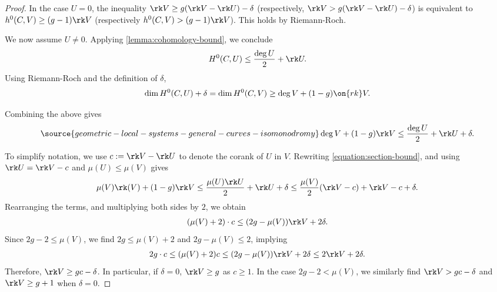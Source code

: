 \begin{proof}
	In the case $U = 0$, the inequality
	$\rk V \geq g (\rk V - \rk U)-\delta$ (respectively, $\rk V> g (\rk V - \rk
	U)-\delta$)
	is equivalent to
	$h^0(C, V) \geq (g-1) \rk V$ (respectively $h^0(C, V) > (g-1) \rk V$).
	This holds by Riemann-Roch.

	We now assume $U \neq 0$.
	Applying \autoref{lemma:cohomology-bound}, we conclude
	\begin{align*}
	H^0(C,U) \leq \frac{\deg
	U}{2} + \rk U.
	\end{align*}
	Using Riemann-Roch and the definition of $\delta$,
	\begin{align*}
	\dim H^0(C,U) + \delta = \dim H^0(C, V) \geq \deg V + (1-g)
	\on{rk}
	V.
	\end{align*}

	Combining the above gives
	\begin{align}
		\label{equation:section-bound}
\source{geometric-local-systems-general-curves-isomonodromy}
		\deg V + (1-g) \rk V \leq \frac{\deg U}{2} + \rk U + \delta.
	\end{align}

	To simplify notation, we use $c := \rk V - \rk U$ to denote the corank
	of $U$ in $V$.
	Rewriting \eqref{equation:section-bound}, and using $\rk U = \rk V - c$ and $\mu(U) \leq
	\mu(V)$ gives
	\begin{align*}
		\mu(V) \rk (V) + (1-g) \rk V \leq \frac{\mu(U) \rk U}{2} + \rk U
		+ \delta
		\leq \frac{\mu(V)}{2} (\rk V - c) + \rk V - c + \delta.
	\end{align*}
	Rearranging the terms,
	and multiplying both sides by $2$, we obtain
	\begin{align*}
		(\mu(V)+2) \cdot c \leq (2g-\mu(V)) \rk V + 2 \delta.
	\end{align*}
	Since $2g-2 \leq \mu(V)$, we find
	$2g \leq \mu(V) + 2$ and $2g - \mu(V) \leq 2$, implying
	\begin{align*}
		2g \cdot c \leq (\mu(V) + 2)c \leq (2g-\mu(V)) \rk V +2\delta
		\leq 2 \rk V +2\delta.
	\end{align*}
	Therefore, $\rk V \geq gc - \delta$.
	In particular, if $\delta =0$, $\rk V \geq g$ as $c \geq 1$.
	In the case $2g-2 < \mu(V)$, we similarly find $\rk V > gc - \delta$
	and $\rk V \geq g + 1$ when $\delta = 0$.
\end{proof}

